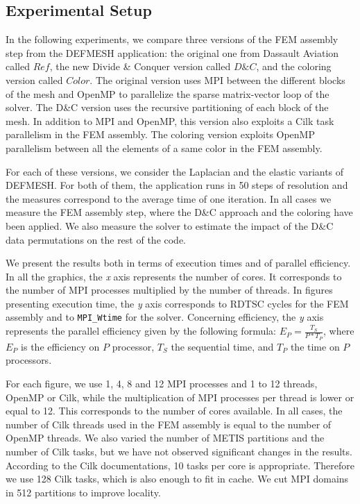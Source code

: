 \documentclass{IOS-Book-Article}
\begin{document}
\subsection{Experimental Setup}
In the following experiments, we compare three versions of the FEM assembly step from the DEFMESH application:
the original one from Dassault Aviation called $Ref$, the new Divide \& Conquer version called $D\&C$, and the coloring version called $Color$.
The original version uses MPI between the different blocks of the mesh and OpenMP to parallelize the sparse matrix-vector loop of the solver.
The D\&C version uses the recursive partitioning of each block of the mesh.
In addition to MPI and OpenMP, this version also exploits a Cilk task parallelism in the FEM assembly.
The coloring version exploits OpenMP parallelism between all the elements of a same color in the FEM assembly.

For each of these versions, we consider the Laplacian and the elastic variants of DEFMESH.
For both of them, the application runs in 50 steps of resolution and the measures correspond to the average time of one iteration.
In all cases we measure the FEM assembly step, where the D\&C approach and the coloring have been applied.
We also measure the solver to estimate the impact of the D\&C data permutations on the rest of the code.

We present the results both in terms of execution times and of parallel efficiency.
In all the graphics, the \emph{x} axis represents the number of cores. It corresponds to the number of MPI processes multiplied by the number of threads.
In figures presenting execution time, the \emph{y} axis corresponds to RDTSC cycles for the FEM assembly and to \texttt{MPI\_Wtime} for the solver.
Concerning efficiency, the \emph{y} axis represents the parallel efficiency given by the following formula:
$E_{P} = \frac{T_{S}}{P*T_{P}}$, where $E_{P}$ is the efficiency on $P$ processor, $T_{S}$ the sequential time, and $T_{P}$ the time on $P$ processors.

For each figure, we use 1, 4, 8 and 12 MPI processes and 1 to 12 threads, OpenMP or Cilk, while the multiplication of MPI processes per thread is lower or equal to 12.
This corresponds to the number of cores available. In all cases, the number of Cilk threads used in the FEM assembly is equal to the number of OpenMP threads.
We also varied the number of METIS partitions and the number of Cilk tasks, but we have not observed significant changes in the results.
According to the Cilk documentations, 10 tasks per core is appropriate. Therefore we use 128 Cilk tasks, which is also enough to fit in cache.
We cut MPI domains in 512 partitions to improve locality.
\end{document}
